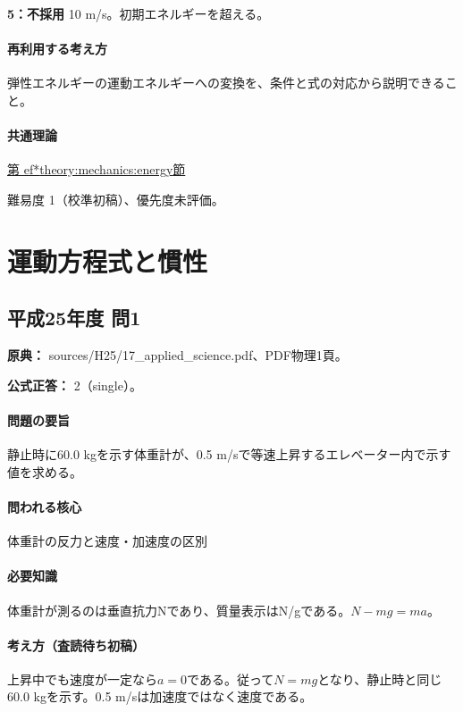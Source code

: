 \noindent\textbf{5：不採用} 10 m/s。初期エネルギーを超える。\par

\paragraph{再利用する考え方} 弾性エネルギーの運動エネルギーへの変換を、条件と式の対応から説明できること。

\paragraph{共通理論} \hyperref[theory:mechanics:energy]{第
ef*{theory:mechanics:energy}節}

\par 難易度 1（校準初稿）、優先度未評価。

\section{運動方程式と慣性}

\subsection{平成25年度 問1}
\label{q:h25-reg-applied-01}

\noindent\textbf{原典：} sources/H25/17\_applied\_science.pdf、PDF物理1頁。

\textbf{公式正答：} 2（single）。

\paragraph{問題の要旨} 静止時に60.0 kgを示す体重計が、0.5 m/sで等速上昇するエレベーター内で示す値を求める。

\paragraph{問われる核心} 体重計の反力と速度・加速度の区別

\paragraph{必要知識} 体重計が測るのは垂直抗力Nであり、質量表示はN/gである。\(N-mg=ma\)。

\paragraph{考え方（査読待ち初稿）} 上昇中でも速度が一定なら\(a=0\)である。従って\(N=mg\)となり、静止時と同じ60.0 kgを示す。0.5 m/sは加速度ではなく速度である。

